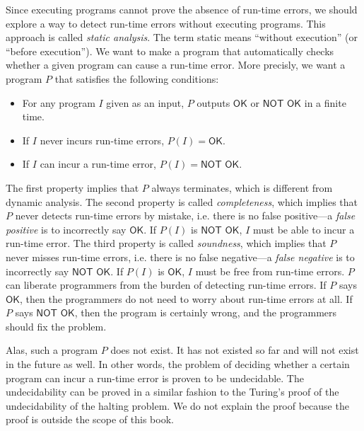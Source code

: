Since executing programs cannot prove the absence of run-time errors, we should
explore a way to detect run-time errors without executing programs. This
approach is called \textit{static analysis}. The term
static means ``without execution'' (or ``before execution''). We want to make
a program that automatically checks whether a given program can cause a run-time
error.
More precisly, we want a program $P$ that satisfies the following conditions:
\begin{itemize}
  \item For any program $I$ given as an input, $P$ outputs $\textsf{OK}$ or
    $\textsf{NOT OK}$ in a finite time.
  \item If $I$ never incurs run-time errors,
    $P(I)=\textsf{OK}$.
  \item If $I$ can incur a run-time error, $P(I)=\textsf{NOT OK}$.
\end{itemize}
The first property implies that $P$ always terminates, which is different from
dynamic analysis.
The second property is called \textit{completeness},
which implies that $P$ never detects run-time errors by mistake, i.e. there is
no false positive---a \textit{false positive}
is to incorrectly say $\textsf{OK}$.
If $P(I)$ is $\textsf{NOT OK}$, $I$ must be able to incur a run-time
error.
The third property is called \textit{soundness},
which implies that $P$ never misses run-time errors, i.e. there is no false
negative---a \textit{false negative}
is to incorrectly say $\textsf{NOT OK}$.
If $P(I)$ is $\textsf{OK}$, $I$ must be free from run-time
errors.
$P$ can liberate programmers from the burden of detecting run-time errors.
If $P$ says $\textsf{OK}$, then the programmers do not need to worry about run-time
errors at all. If $P$ says $\textsf{NOT OK}$, then the program is certainly wrong, and
the programmers should fix the problem.

Alas, such a program $P$ does not exist. It has not existed so far and will
not exist in the future as well. In other words, the problem of deciding whether
a certain program can incur a run-time error is proven to be undecidable. The
undecidability can be proved in a similar fashion to the Turing's proof of the
undecidability of the halting problem. We do not explain the proof because the proof
is outside the scope of this book.

